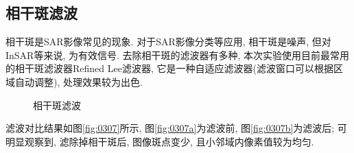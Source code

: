 \newpage
\subsection{相干斑滤波}
相干斑是SAR影像常见的现象. 对于SAR影像分类等应用, 相干斑是噪声, 但对InSAR等来说, 为有效信号. 去除相干斑的滤波器有多种, 本次实验使用目前最常用的相干斑滤波器Refined Lee滤波器, 它是一种自适应滤波器(滤波窗口可以根据区域自动调整), 处理效果较为出色.

\begin{figure}[htbp]
    \centering
    \qquad
    \caption{相干斑滤波}
    \label{fig:0306}
\end{figure}

滤波对比结果如图\ref{fig:0307}所示, 图\ref{fig:0307a}为滤波前, 图\ref{fig:0307b}为滤波后; 可明显观察到, 滤除掉相干斑后, 图像斑点变少, 且小邻域内像素值较为均匀.

